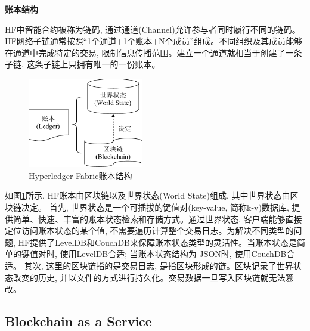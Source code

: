 \textbf{账本结构}

HF中智能合约被称为链码, 通过通道(Channel)允许参与者同时履行不同的链码。HF网络子链通常按照“1个通道+1个账本+N个成员”组成。不同组织及其成员能够在通道中完成特定的交易, 限制信息传播范围。建立一个通道就相当于创建了一条子链, 这条子链上只拥有唯一的一份账本。

\begin{figure}[h] %
    \centering %
    \includegraphics[width=0.45\textwidth]{FIGs/chapter2/ledger.pdf} %
    \caption{Hyperledger Fabric账本结构} %
    \label{fabric_ledger} %
\end{figure}%

如图\ref{fabric_ledger}所示, HF账本由区块链以及世界状态(World State)组成, 其中世界状态由区块链决定。
首先, 世界状态是一个可插拔的键值对(key-value, 简称k-v)数据库, 提供简单、快速、丰富的账本状态检索和存储方式。通过世界状态, 客户端能够直接定位访问账本状态的某个值, 不需要遍历计算整个交易日志。为解决不同类型的问题, HF提供了LevelDB和CouchDB来保障账本状态类型的灵活性。当账本状态是简单的键值对时, 使用LevelDB合适; 当账本状态结构为 JSON时, 使用CouchDB合适。
其次, 这里的区块链指的是交易日志, 是指区块形成的链。区块记录了世界状态改变的历史, 并以文件的方式进行持久化。交易数据一旦写入区块链就无法篡改。

\subsection{Blockchain as a Service}\label{section: BaaS}

